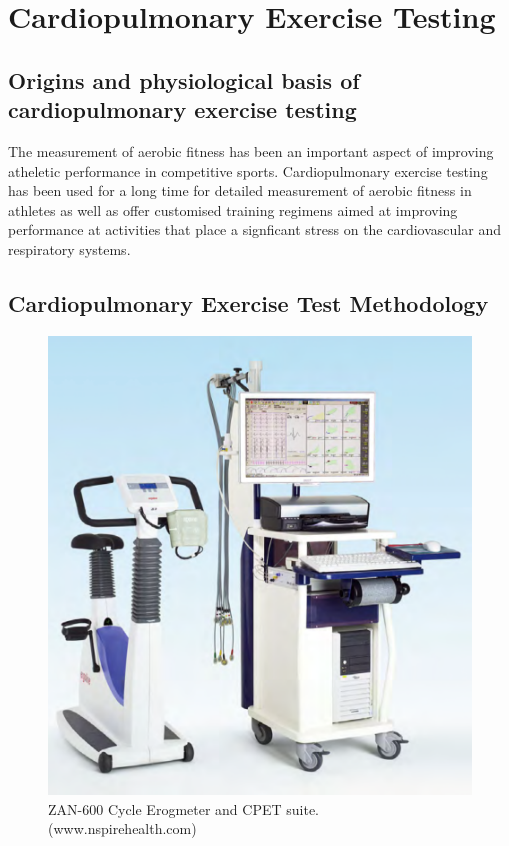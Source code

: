 \section{Cardiopulmonary Exercise Testing}

\subsection{Origins and physiological basis of cardiopulmonary exercise testing}
The measurement of aerobic fitness has been an important aspect of improving atheletic performance in competitive sports. Cardiopulmonary exercise testing has been used for a long time for detailed measurement of aerobic fitness in athletes as well as offer customised training regimens aimed at improving performance at activities that place a signficant stress on the cardiovascular and respiratory systems.


\subsection{Cardiopulmonary Exercise Test Methodology}
\label{sec:cpx_method}

\begin{figure}[htbp]
	\centering
	\includegraphics[width=\textwidth]{Figures/cpet-zan}
	\caption{ZAN-600 Cycle Erogmeter and CPET suite. (www.nspirehealth.com)}
	\label{fig:cpet-zan}
\end{figure}

